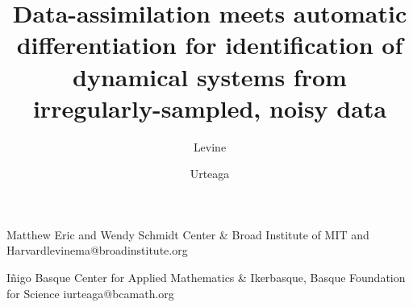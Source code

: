 \documentclass[communication]{CEDYA}
\begin{document}
%




\title{Data-assimilation meets automatic differentiation for identification of dynamical systems from irregularly-sampled, noisy data}

\begin{authors}
	\author{Levine}{Matthew}{
	Eric and Wendy Schmidt Center \& 
	Broad Institute of MIT and Harvard}{levinema@broadinstitute.org }
\author*{Urteaga}{I\~nigo}{
	Basque Center for Applied Mathematics \&
	Ikerbasque, Basque Foundation
	for Science
}{iurteaga@bcamath.org}
\end{authors}


\end{document}
